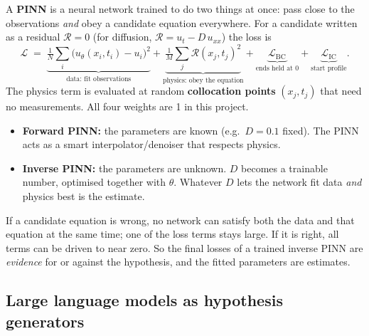A \textbf{PINN} is a neural network trained to do two things at once: pass close to the observations
\emph{and} obey a candidate equation everywhere. For a candidate written as a residual $\mathcal{R}=0$ (for
diffusion, $\mathcal{R} = u_t - D\,u_{xx}$) the loss is
\[
  \mathcal{L} \;=\;
  \underbrace{\tfrac1N\textstyle\sum_i \big(u_\theta(x_i,t_i) - u_i\big)^2}_{\text{data: fit observations}}
  + \underbrace{\tfrac1M\textstyle\sum_j \mathcal{R}(x_j,t_j)^2}_{\text{physics: obey the equation}}
  + \underbrace{\mathcal{L}_{\text{BC}}}_{\text{ends held at 0}}
  + \underbrace{\mathcal{L}_{\text{IC}}}_{\text{start profile}} .
\]
The physics term is evaluated at random \textbf{collocation points} $(x_j,t_j)$ that need no measurements.
All four weights are 1 in this project.
\begin{itemize}
  \item \textbf{Forward PINN:} the parameters are known (e.g.\ $D=0.1$ fixed). The PINN acts as a smart
        interpolator/denoiser that respects physics.
  \item \textbf{Inverse PINN:} the parameters are unknown. $D$ becomes a trainable number, optimised together
        with $\theta$. Whatever $D$ lets the network fit data \emph{and} physics best is the estimate.
\end{itemize}

\begin{intuition}
If a candidate equation is wrong, no network can satisfy both the data and that equation at the same time;
one of the loss terms stays large. If it is right, all terms can be driven to near zero. So the final losses of a
trained inverse PINN are \emph{evidence} for or against the hypothesis, and the fitted parameters are estimates.
\end{intuition}

\subsection{Large language models as hypothesis generators}

